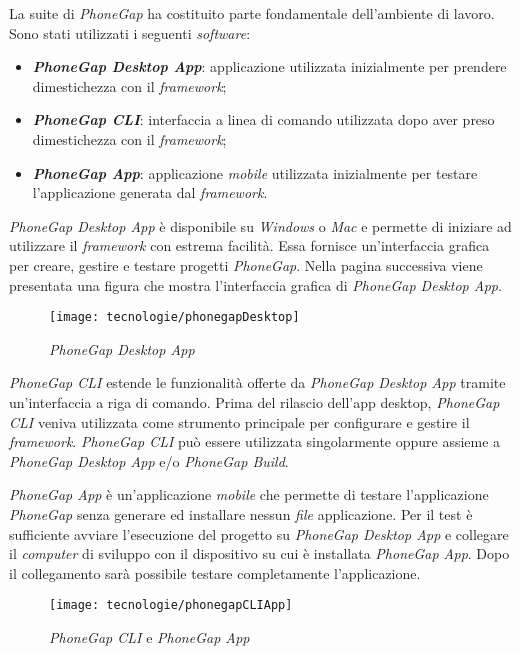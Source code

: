 La suite di \textit{PhoneGap} ha costituito parte fondamentale dell'ambiente di lavoro. Sono stati utilizzati i seguenti \textit{software}:
\begin{itemize}
	\item \textbf{\textit{PhoneGap Desktop App}}: applicazione utilizzata inizialmente per prendere dimestichezza con il \textit{framework};
	\item \textbf{\textit{PhoneGap CLI}}: interfaccia a linea di comando utilizzata dopo aver preso dimestichezza con il \textit{framework};
	\item \textbf{\textit{PhoneGap App}}: applicazione \textit{mobile} utilizzata inizialmente per testare l'applicazione generata dal \textit{framework}.
\end{itemize}

\textit{PhoneGap Desktop App} è disponibile su \textit{Windows} o \textit{Mac} e permette di iniziare ad utilizzare il \textit{framework} con estrema facilità. Essa fornisce un'interfaccia grafica per creare, gestire e testare progetti \textit{PhoneGap}. Nella pagina successiva viene presentata una figura che mostra l'interfaccia grafica di \textit{PhoneGap Desktop App}.

\begin{figure}[!h] 
    \centering 
    \texttt{[image: tecnologie/phonegapDesktop]} 
    \caption{\textit{PhoneGap Desktop App}}
\end{figure}

\newpage

\textit{PhoneGap CLI} estende le funzionalità offerte da \textit{PhoneGap Desktop App} tramite un'interfaccia a riga di comando. Prima del rilascio dell'app desktop, \textit{PhoneGap CLI} veniva utilizzata come strumento principale per configurare e gestire il \textit{framework}. \textit{PhoneGap CLI} può essere utilizzata singolarmente oppure assieme a \textit{PhoneGap Desktop App} e/o \textit{PhoneGap Build}.

\textit{PhoneGap App} è un'applicazione \textit{mobile} che permette di testare l'applicazione \textit{PhoneGap} senza generare ed installare nessun \textit{file} applicazione. Per il test è sufficiente avviare l'esecuzione del progetto su \textit{PhoneGap Desktop App} e collegare il \textit{computer} di sviluppo con il dispositivo su cui è installata \textit{PhoneGap App}. Dopo il collegamento sarà possibile testare completamente l'applicazione.

\begin{figure}[!h] 
    \centering 
    \texttt{[image: tecnologie/phonegapCLIApp]} 
    \caption{\textit{PhoneGap CLI} e \textit{PhoneGap App}}
\end{figure}

